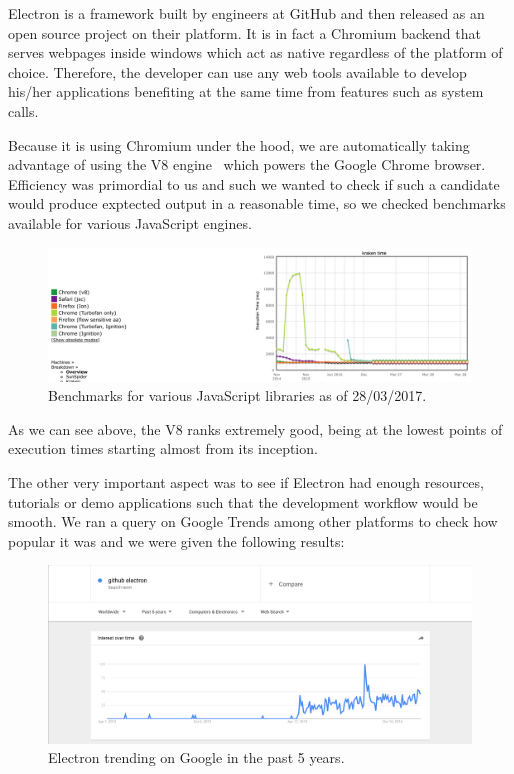 \documentclass{l4proj}
\begin{document}
Electron is a framework built by engineers at GitHub and then released as an open source project on their platform. It is in fact a Chromium backend that serves webpages inside windows which act as native regardless of the platform of choice. Therefore, the developer can use any web tools available to develop his/her applications benefiting at the same time from features such as system calls.

Because it is using Chromium under the hood, we are automatically taking advantage of using the V8 engine~\cite{v8-chrome} which powers the Google Chrome browser. Efficiency was primordial to us and such we wanted to check if such a candidate would produce exptected output in a reasonable time, so we checked benchmarks available for various JavaScript engines.

\begin{figure}[!ht]
    \centering
    \includegraphics[scale=0.35]{v8-benchmark}
    \caption{Benchmarks for various JavaScript libraries as of 28/03/2017.}
    \label{fig:v8-benchmark}
\end{figure}

As we can see above, the V8 ranks extremely good, being at the lowest points of execution times starting almost from its inception.

The other very important aspect was to see if Electron had enough resources, tutorials or demo applications such that the development workflow would be smooth. We ran a query on Google Trends among other platforms to check how popular it was and we were given the following results:

\begin{figure}[!ht]
    \centering
    \includegraphics[scale=0.35]{google-trends-electron}
    \caption{Electron trending on Google in the past 5 years.}
    \label{fig:google-trends-electron}
\end{figure}
\end{document}
